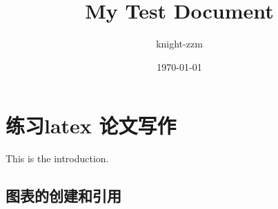 \documentclass[a4paper,12pt]{article}
\begin{document}
\title{My Test Document}
\author{knight-zzm}
\date{\today}
\maketitle
\newpage
\section{练习latex 论文写作}
This is the introduction.

\subsection{图表的创建和引用}
\subsection{}
\end{document}
